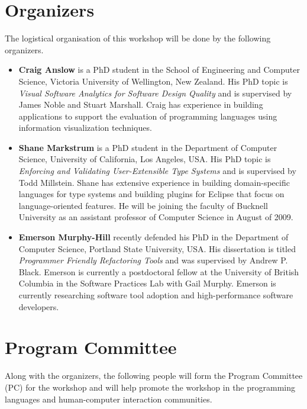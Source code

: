 \documentclass{acm_proc_article-sp}
\begin{document}
\section{Organizers}

The logistical organisation of this workshop will be done by the following organizers.

\begin{itemize}
\item \textbf{Craig Anslow} is a PhD student in the School of
  Engineering and Computer Science, Victoria University of Wellington,
  New Zealand. His PhD topic is \emph{Visual Software Analytics for
    Software Design Quality} and is supervised by James Noble and
  Stuart Marshall. Craig has experience in building applications to
  support the evaluation of programming languages using information
  visualization techniques.

\item \textbf{Shane Markstrum} is a PhD student in the Department of
  Computer Science, University of California, Los Angeles, USA. His
  PhD topic is \emph{Enforcing and Validating User-Extensible Type
    Systems} and is supervised by Todd Millstein. Shane has extensive
  experience in building domain-specific languages for type systems
  and building plugins for Eclipse that focus on language-oriented
  features. He will be joining the faculty of Bucknell University as
  an assistant professor of Computer Science in August of 2009.

\item \textbf{Emerson Murphy-Hill} recently defended his PhD in the
  Department of Computer Science, Portland State University, USA. His
  dissertation is titled \emph{Programmer Friendly Refactoring Tools}
  and was supervised by Andrew P. Black. Emerson is currently a
  postdoctoral fellow at the
  University of British Columbia in the Software Practices Lab with
  Gail Murphy.
  Emerson is currently researching software tool adoption and
  high-performance software developers.
\end{itemize}

\section{Program Committee}

Along with the organizers, the following people will form the Program
Committee (PC) for the workshop and will help promote the workshop in
the programming languages and human-computer interaction communities.
\end{document}
